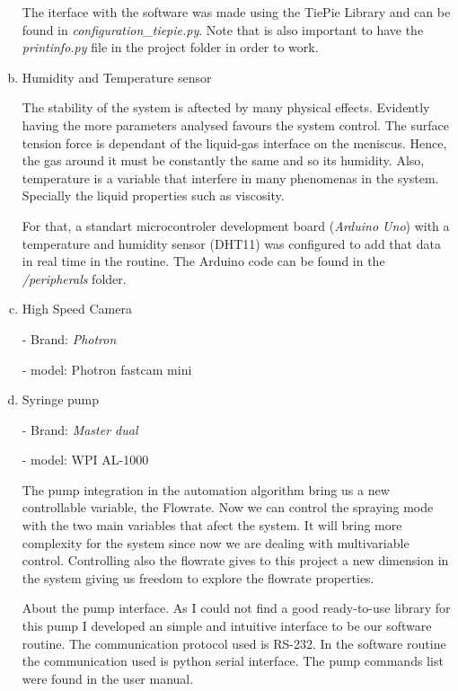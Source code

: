 \begin{enumerate}[a)]
    The iterface with the software was made using the TiePie Library\cite{TiePieLib} and can be found in \emph{configuration\_tiepie.py}. Note that is also important to have the \emph{printinfo.py} file in the project folder in order to work.

  \item Humidity and Temperature sensor
  
  The stability of the system is aftected by many physical effects. Evidently having the more parameters analysed favours the system control.
  The surface tension force is dependant of the liquid-gas interface on the meniscus. Hence, the gas around it must be constantly the same and so its humidity.
  Also, temperature is a variable that interfere in many phenomenas in the system. Specially the liquid properties such as viscosity.

  For that, a standart microcontroler development board (\emph{Arduino Uno}) with a temperature and humidity sensor (DHT11) was configured to add that data in real time in the routine.
  The Arduino code can be found in the \emph{/peripherals} folder.
  

  \item High Speed Camera 
  
  - Brand: \emph{Photron}

  - model: Photron fastcam mini


  
  \item Syringe pump
  
  - Brand: \emph{Master dual}

  - model: WPI AL-1000

  The pump integration in the automation algorithm bring us a new controllable variable, the Flowrate. Now we can control the spraying mode with the
    two main variables that afect the system. 
    It will bring more complexity for the system since now we are dealing with multivariable control.
    Controlling also the flowrate gives to this project a new dimension in the system giving us freedom to explore the flowrate properties.

    About the pump interface. As I could not find a good ready-to-use library for this pump I developed an simple and intuitive interface to be our software routine.
    The communication protocol used is RS-232. In the software routine the communication used is python serial interface. The pump commands list were found in the user manual.


\end{enumerate}
